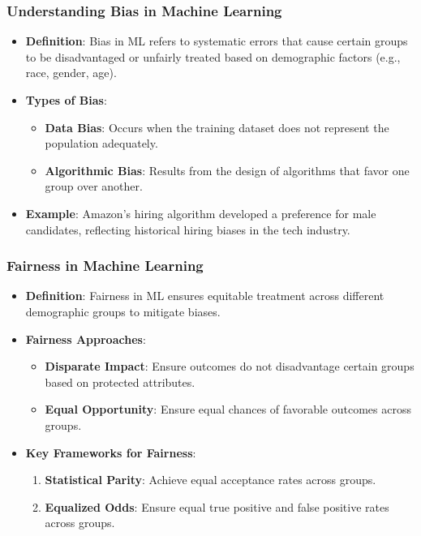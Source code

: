 \documentclass[aspectratio=169]{beamer}
\begin{document}
\begin{frame}[fragile]
    \frametitle{Understanding Bias in Machine Learning}
    \begin{itemize}
        \item \textbf{Definition}: Bias in ML refers to systematic errors that cause certain groups to be disadvantaged or unfairly treated based on demographic factors (e.g., race, gender, age).
        \item \textbf{Types of Bias}:
        \begin{itemize}
            \item \textbf{Data Bias}: Occurs when the training dataset does not represent the population adequately.
            \item \textbf{Algorithmic Bias}: Results from the design of algorithms that favor one group over another.
        \end{itemize}
        \item \textbf{Example}: Amazon's hiring algorithm developed a preference for male candidates, reflecting historical hiring biases in the tech industry.
    \end{itemize}
\end{frame}

\begin{frame}[fragile]
    \frametitle{Fairness in Machine Learning}
    \begin{itemize}
        \item \textbf{Definition}: Fairness in ML ensures equitable treatment across different demographic groups to mitigate biases.
        \item \textbf{Fairness Approaches}:
        \begin{itemize}
            \item \textbf{Disparate Impact}: Ensure outcomes do not disadvantage certain groups based on protected attributes.
            \item \textbf{Equal Opportunity}: Ensure equal chances of favorable outcomes across groups.
        \end{itemize}
        \item \textbf{Key Frameworks for Fairness}:
        \begin{enumerate}
            \item \textbf{Statistical Parity}: Achieve equal acceptance rates across groups.
            \item \textbf{Equalized Odds}: Ensure equal true positive and false positive rates across groups.
        \end{enumerate}
    \end{itemize}
\end{frame}
\end{document}
